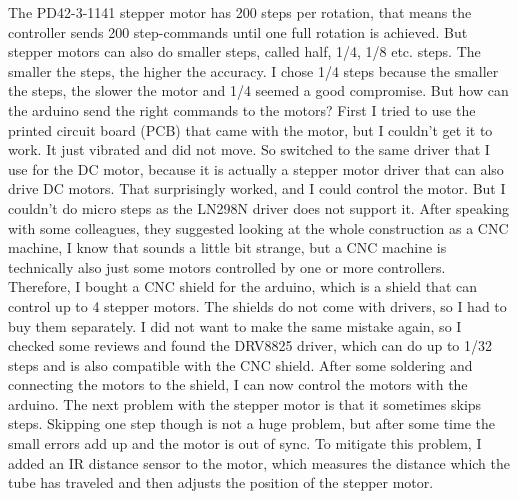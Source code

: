 The PD42-3-1141 stepper motor has 200 steps per rotation, that means the controller sends 200 step-commands until one full rotation is achieved.
But stepper motors can also do smaller steps, called half, 1/4, 1/8 etc. steps.
The smaller the steps, the higher the accuracy.
I chose 1/4 steps because the smaller the steps, the slower the motor and 1/4 seemed a good compromise.
But how can the arduino send the right commands to the motors?
First I tried to use the printed circuit board (PCB) that came with the motor, but I couldn't get it to work.
It just vibrated and did not move.
So switched to the same driver that I use for the DC motor, because it is actually a stepper motor driver that can also drive DC motors.
That surprisingly worked, and I could control the motor.
But I couldn't do micro steps as the LN298N driver does not support it.
After speaking with some colleagues, they suggested looking at the whole construction as a CNC machine, I know that sounds a little bit strange, but a CNC machine is technically also just some motors controlled by one or more controllers.
Therefore, I bought a CNC shield for the arduino, which is a shield that can control up to 4 stepper motors.
The shields do not come with drivers, so I had to buy them separately.
I did not want to make the same mistake again, so I checked some reviews and found the DRV8825\autocite{drv8825} driver, which can do up to 1/32 steps and is also compatible with the CNC shield.
After some soldering and connecting the motors to the shield, I can now control the motors with the arduino.
The next problem with the stepper motor is that it sometimes skips steps.
Skipping one step though is not a huge problem, but after some time the small errors add up and the motor is out of sync.
To mitigate this problem, I added an IR distance sensor to the motor, which measures the distance which the tube has traveled and then adjusts the position of the stepper motor.

